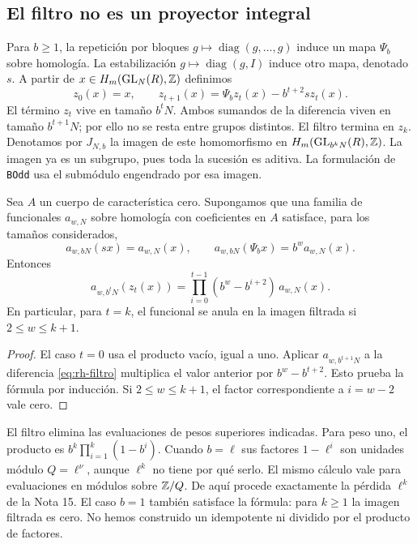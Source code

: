 \subsection{El filtro no es un proyector integral}

Para $b\ge1$, la repetición por bloques $g\mapsto\operatorname{diag}(g,\dots,g)$ induce un mapa $\Psi_b$ sobre homología. La estabilización $g\mapsto\operatorname{diag}(g,I)$ induce otro mapa, denotado $s$. A partir de $x\in H_m(\operatorname{GL}_N(R),\mathbb{Z})$ definimos
\begin{equation}
 z_0(x)=x,\qquad z_{t+1}(x)=\Psi_bz_t(x)-b^{t+2}s z_t(x).
 \label{eq:rh-filtro}
\end{equation}
El término $z_t$ vive en tamaño $b^tN$. Ambos sumandos de la diferencia viven en tamaño $b^{t+1}N$; por ello no se resta entre grupos distintos. El filtro termina en $z_k$. Denotamos por $J_{N,b}$ la imagen de este homomorfismo en $H_m(\operatorname{GL}_{b^kN}(R),\mathbb{Z})$. La imagen ya es un subgrupo, pues toda la sucesión es aditiva. La formulación de \texttt{BOdd} usa el submódulo engendrado por esa imagen.

\begin{proposicion}
\label{prop:rh-pesos}
Sea $A$ un cuerpo de característica cero. Supongamos que una familia de funcionales $a_{w,N}$ sobre homología con coeficientes en $A$ satisface, para los tamaños considerados,
\[
 a_{w,bN}(sx)=a_{w,N}(x),\qquad
 a_{w,bN}(\Psi_bx)=b^w a_{w,N}(x).
\]
Entonces
\begin{equation}
 a_{w,b^tN}(z_t(x))=
 \prod_{i=0}^{t-1}(b^w-b^{i+2})\,a_{w,N}(x).
 \label{eq:rh-producto-pesos}
\end{equation}
En particular, para $t=k$, el funcional se anula en la imagen filtrada si $2\le w\le k+1$.
\end{proposicion}
\begin{proof}
El caso $t=0$ usa el producto vacío, igual a uno. Aplicar $a_{w,b^{t+1}N}$ a la diferencia \eqref{eq:rh-filtro} multiplica el valor anterior por $b^w-b^{t+2}$. Esto prueba la fórmula por inducción. Si $2\le w\le k+1$, el factor correspondiente a $i=w-2$ vale cero.
\end{proof}

El filtro elimina las evaluaciones de pesos superiores indicadas. Para peso uno, el producto es $b^k\prod_{i=1}^k(1-b^i)$. Cuando $b=\ell$ sus factores $1-\ell^i$ son unidades módulo $Q=\ell^\nu$, aunque $\ell^k$ no tiene por qué serlo. El mismo cálculo vale para evaluaciones en módulos sobre $\mathbb{Z}/Q$. De aquí procede exactamente la pérdida $\ell^k$ de la Nota 15. El caso $b=1$ también satisface la fórmula: para $k\ge1$ la imagen filtrada es cero. No hemos construido un idempotente ni dividido por el producto de factores.

